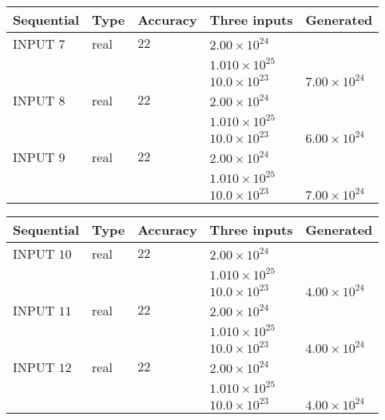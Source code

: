 \documentclass[12pt]{article}
\begin{document}
   
  
  
\noindent\begin{tabular}{|l|l|l|l|l|}
\hline
 Sequential & Type & Accuracy & Three inputs & Generated \\ 
\hline
 
 
  INPUT $           7$ & real & $          22 $ & $
 2.00 \times 10^{24}
  $ & \\
  & & &  $
 1.010 \times 10^{25}
  $ & \\
  & & &  $
 10.0 \times 10^{23}
 $ & $ 7.00 \times 10^{24} $ 
 \\  \hline  
 
 
  INPUT $           8$ & real & $          22 $ & $
 2.00 \times 10^{24}
  $ & \\
  & & &  $
 1.010 \times 10^{25}
  $ & \\
  & & &  $
 10.0 \times 10^{23}
 $ & $ 6.00 \times 10^{24} $ 
 \\  \hline  
 
 
  INPUT $           9$ & real & $          22 $ & $
 2.00 \times 10^{24}
  $ & \\
  & & &  $
 1.010 \times 10^{25}
  $ & \\
  & & &  $
 10.0 \times 10^{23}
 $ & $ 7.00 \times 10^{24} $ 
 \\  \hline  
 \end{tabular}
   
   
  
  
\noindent\begin{tabular}{|l|l|l|l|l|}
\hline
 Sequential & Type & Accuracy & Three inputs & Generated \\ 
\hline
 
 
  INPUT $          10$ & real & $          22 $ & $
 2.00 \times 10^{24}
  $ & \\
  & & &  $
 1.010 \times 10^{25}
  $ & \\
  & & &  $
 10.0 \times 10^{23}
 $ & $ 4.00 \times 10^{24} $ 
 \\  \hline  
 
 
  INPUT $          11$ & real & $          22 $ & $
 2.00 \times 10^{24}
  $ & \\
  & & &  $
 1.010 \times 10^{25}
  $ & \\
  & & &  $
 10.0 \times 10^{23}
 $ & $ 4.00 \times 10^{24} $ 
 \\  \hline  
 
 
  INPUT $          12$ & real & $          22 $ & $
 2.00 \times 10^{24}
  $ & \\
  & & &  $
 1.010 \times 10^{25}
  $ & \\
  & & &  $
 10.0 \times 10^{23}
 $ & $ 4.00 \times 10^{24} $ 
 \\  \hline  
 \end{tabular}
   
\end{document}
